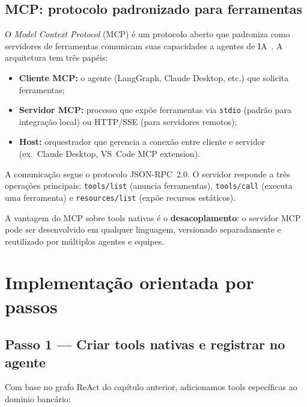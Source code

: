 \subsection{MCP: protocolo padronizado para ferramentas}
\label{sec:mcp_protocolo}

O \textit{Model Context Protocol}
(MCP) \'e um
protocolo aberto que padroniza como servidores de ferramentas
comunicam suas capacidades a agentes de IA~\cite{mcp2024}.
A arquitetura tem tr\^es pap\'eis:

\begin{itemize}[leftmargin=*]
  \item \textbf{Cliente MCP:} o agente (LangGraph, Claude Desktop,
        etc.) que solicita ferramentas;
  \item \textbf{Servidor MCP:} processo que expõe ferramentas via
        \texttt{stdio} (padr\~ao para integra\c{c}\~ao local) ou
        HTTP/SSE (para servidores remotos);
  \item \textbf{Host:} orquestrador que gerencia a conex\~ao entre
        cliente e servidor (ex.\ Claude Desktop, VS~Code MCP
        extension).
\end{itemize}

A comunica\c{c}\~ao segue o protocolo JSON-RPC~2.0. O servidor
responde a tr\^es opera\c{c}\~oes principais: \texttt{tools/list}
(anuncia ferramentas), \texttt{tools/call} (executa uma ferramenta)
e \texttt{resources/list} (expõe recursos est\'aticos).

A vantagem do MCP sobre tools nativas \'e o \textbf{desacoplamento}:
o servidor MCP pode ser desenvolvido em qualquer linguagem,
versionado separadamente e reutilizado por m\'ultiplos agentes
e equipes.

\section{Implementa\c{c}\~ao orientada por passos}

\subsection{Passo 1 --- Criar tools nativas e registrar no agente}

Com base no grafo ReAct do cap\'itulo anterior, adicionamos tools
espec\'ificas ao dominio banc\'ario:

